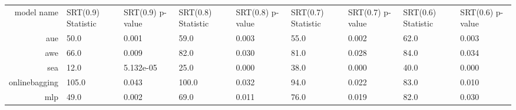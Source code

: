 \begin{tabular}{|r|l|l|l|l|l|l|l|l|}
  \hline
  model name & SRT(0.9) Statistic & SRT(0.9) p-value & SRT(0.8) Statistic & SRT(0.8) p-value & SRT(0.7) Statistic & SRT(0.7) p-value & SRT(0.6) Statistic & SRT(0.6) p-value \\ 
  aue & 50.0 & 0.001 & 59.0 & 0.003 & 55.0 & 0.002 & 62.0 & 0.003 \\ 
  awe & 66.0 & 0.009 & 82.0 & 0.030 & 81.0 & 0.028 & 84.0 & 0.034 \\ 
  sea & 12.0 & 5.132e-05 & 25.0 & 0.000 & 38.0 & 0.000 & 40.0 & 0.000 \\ 
  onlinebagging & 105.0 & 0.043 & 100.0 & 0.032 & 94.0 & 0.022 & 83.0 & 0.010 \\ 
  mlp & 49.0 & 0.002 & 69.0 & 0.011 & 76.0 & 0.019 & 82.0 & 0.030 \\ 
\end{tabular}
